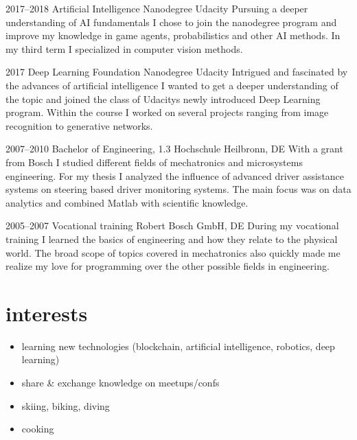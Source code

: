 \documentclass[]{friggeri-cv} %
\begin{document}
\begin{entrylist}

\entry
{2017--2018}
{Artificial Intelligence {\normalfont Nanodegree}}
{Udacity}
{Pursuing a deeper understanding of AI fundamentals I chose to join the nanodegree program and improve my knowledge in game agents, probabilistics and other AI methods. In my third term I specialized in computer vision methods.}

\entry
{2017}
{Deep Learning {\normalfont Foundation Nanodegree}}
{Udacity}
{Intrigued and fascinated by the advances of artificial intelligence I wanted to get a deeper understanding of the topic and joined the class of Udacitys newly introduced Deep Learning program. Within the course I worked on several projects ranging from image recognition to generative networks.}

\entry
{2007--2010}
{Bachelor {\normalfont of Engineering,} 1.3}
{Hochschule Heilbronn, DE}
{With a grant from Bosch I studied different fields of mechatronics and microsystems engineering. For my thesis I analyzed the influence of advanced driver assistance systems on steering based driver monitoring systems. The main focus was on data analytics and combined Matlab with scientific knowledge.
}

\entry
{2005--2007}
{Vocational training}
{Robert Bosch GmbH, DE}
{During my vocational training I learned the basics of engineering and how they relate to the physical world. The broad scope of topics covered in mechatronics also quickly made me realize my love for programming over the other possible fields in engineering.
}
\end{entrylist}


\section{\color{green}interests}
\begin{itemize}
\item learning new technologies (blockchain, artificial intelligence, robotics, deep learning)
\item share \& exchange knowledge on meetups/confs
\item skiing, biking, diving
\item cooking
\end{itemize}
\end{document}

